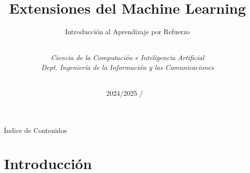\documentclass[10pt, envcountsect, handout, aspectratio=1610, hyperref={hypertexnames=true}]{beamer}
\title[Aprendizaje por Refuerzo]{Extensiones del Machine Learning}
\subtitle{Introducción al Aprendizaje por Refuerzo} %
\author[L. D. Hernández] %
{%
	\sc{Luis Daniel Hernández Molinero }\\ %
	\textit{Ciencia de la Computación e Inteligencia Artificial}\\  %
	\textit{Dept. Ingeniería de la Información y las Comunicaciones}\\  %
	\\   %
}
\institute[DIIC]%
{
	\textit{Universidad de Murcia}
}
\date{2024/2025} %
\date{\arabic{yearprev} / \the\year\ } %
\begin{document}
	



\begin{frame}[plain]
	\titlepage
\end{frame}


\begin{frame}{Índice de Contenidos}
	\tableofcontents 
\end{frame}





\section{Introducción}
\end{document}
